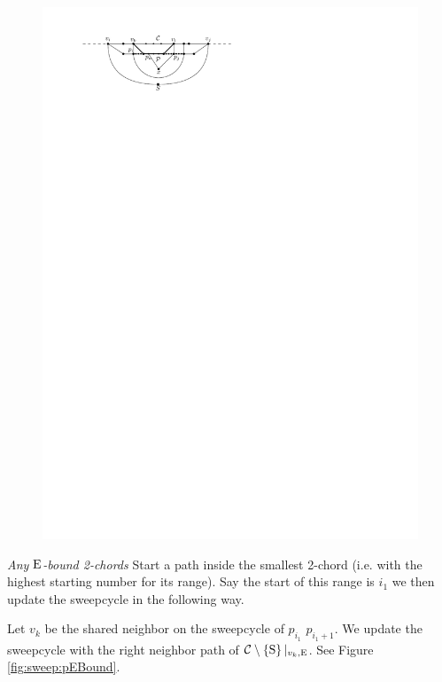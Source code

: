     \begin{figure}[h]
      \centering
      \includegraphics[scale=1]{unifiedAlgo/img/sweep/2chordInChordUpdate}
      \caption{}
      \label{fig:sweep:2chordInChordUpdate}
    \end{figure}

    \emph{Any $\mathrm{E}$-bound 2-chords}
    Start a path inside the smallest 2-chord (i.e. with the highest starting number for its range). Say the start of this range is $i_1$ we then update the sweepcycle in the following way.

    Let $v_k$ be the shared neighbor on the sweepcycle of $p_{i_1}$ $p_{i_1 +1}$. We update the sweepcycle with the right neighbor path of $\mathcal{C} \setminus \left\lbrace {\mathrm{S}} \right\rbrace|_{v_k, \mathrm{E}}$. See Figure \ref{fig:sweep:pEBound}.

